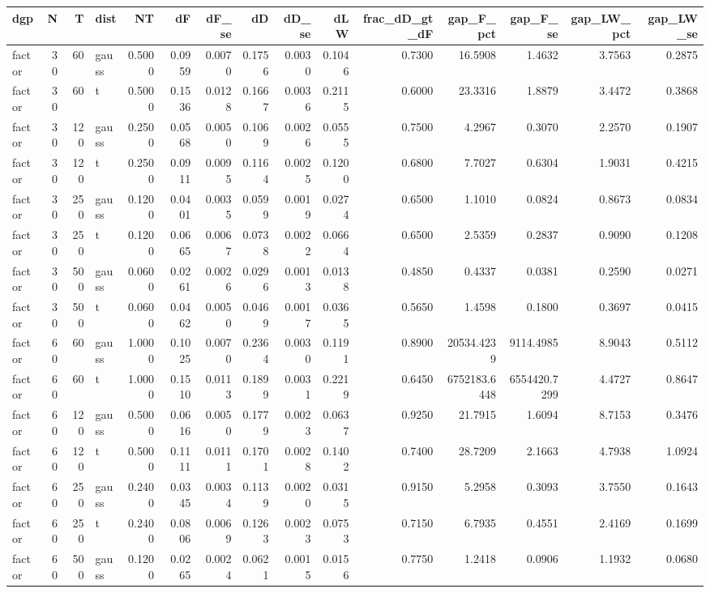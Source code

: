 \begin{tabular}{lrrlrrrrrrrrrrr}
\toprule
dgp & N & T & dist & NT & dF & dF_se & dD & dD_se & dLW & frac_dD_gt_dF & gap_F_pct & gap_F_se & gap_LW_pct & gap_LW_se \\
\midrule
factor & 30 & 60 & gauss & 0.5000 & 0.0959 & 0.0070 & 0.1756 & 0.0030 & 0.1046 & 0.7300 & 16.5908 & 1.4632 & 3.7563 & 0.2875 \\
factor & 30 & 60 & t & 0.5000 & 0.1536 & 0.0128 & 0.1667 & 0.0036 & 0.2115 & 0.6000 & 23.3316 & 1.8879 & 3.4472 & 0.3868 \\
factor & 30 & 120 & gauss & 0.2500 & 0.0568 & 0.0050 & 0.1069 & 0.0026 & 0.0555 & 0.7500 & 4.2967 & 0.3070 & 2.2570 & 0.1907 \\
factor & 30 & 120 & t & 0.2500 & 0.0911 & 0.0095 & 0.1164 & 0.0025 & 0.1200 & 0.6800 & 7.7027 & 0.6304 & 1.9031 & 0.4215 \\
factor & 30 & 250 & gauss & 0.1200 & 0.0401 & 0.0035 & 0.0599 & 0.0019 & 0.0274 & 0.6500 & 1.1010 & 0.0824 & 0.8673 & 0.0834 \\
factor & 30 & 250 & t & 0.1200 & 0.0665 & 0.0067 & 0.0738 & 0.0022 & 0.0664 & 0.6500 & 2.5359 & 0.2837 & 0.9090 & 0.1208 \\
factor & 30 & 500 & gauss & 0.0600 & 0.0261 & 0.0026 & 0.0296 & 0.0013 & 0.0138 & 0.4850 & 0.4337 & 0.0381 & 0.2590 & 0.0271 \\
factor & 30 & 500 & t & 0.0600 & 0.0462 & 0.0050 & 0.0469 & 0.0017 & 0.0365 & 0.5650 & 1.4598 & 0.1800 & 0.3697 & 0.0415 \\
factor & 60 & 60 & gauss & 1.0000 & 0.1025 & 0.0070 & 0.2364 & 0.0030 & 0.1191 & 0.8900 & 20534.4239 & 9114.4985 & 8.9043 & 0.5112 \\
factor & 60 & 60 & t & 1.0000 & 0.1510 & 0.0113 & 0.1899 & 0.0031 & 0.2219 & 0.6450 & 6752183.6448 & 6554420.7299 & 4.4727 & 0.8647 \\
factor & 60 & 120 & gauss & 0.5000 & 0.0616 & 0.0050 & 0.1779 & 0.0023 & 0.0637 & 0.9250 & 21.7915 & 1.6094 & 8.7153 & 0.3476 \\
factor & 60 & 120 & t & 0.5000 & 0.1111 & 0.0111 & 0.1701 & 0.0028 & 0.1402 & 0.7400 & 28.7209 & 2.1663 & 4.7938 & 1.0924 \\
factor & 60 & 250 & gauss & 0.2400 & 0.0345 & 0.0034 & 0.1139 & 0.0020 & 0.0315 & 0.9150 & 5.2958 & 0.3093 & 3.7550 & 0.1643 \\
factor & 60 & 250 & t & 0.2400 & 0.0806 & 0.0069 & 0.1263 & 0.0023 & 0.0753 & 0.7150 & 6.7935 & 0.4551 & 2.4169 & 0.1699 \\
factor & 60 & 500 & gauss & 0.1200 & 0.0265 & 0.0024 & 0.0621 & 0.0015 & 0.0156 & 0.7750 & 1.2418 & 0.0906 & 1.1932 & 0.0680 \\

\end{tabular}
